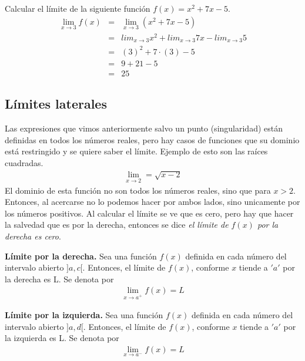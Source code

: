 \begin{myexample}
Calcular el límite de  la siguiente función $f(x)=x^{2}+7x-5$.
\begin{eqnarray*}
\lim_{x\rightarrow 3}f(x)&=&\lim_{x\rightarrow 3}(x^{2}+7x-5)\\
&=&lim_{x\rightarrow 3}x^{2}+lim_{x\rightarrow 3}7x-lim_{x\rightarrow 3}5\\
&=&(3)^{2}+7\cdot (3)-5\\
&=&9+21-5\\
&=&25
\end{eqnarray*}
\end{myexample}

\subsection{Límites laterales}

Las expresiones que vimos anteriormente salvo un punto (singularidad) están definidas en todos los números reales, pero hay casos de funciones que su dominio está restringido y se quiere saber el límite. Ejemplo de esto son las raíces cuadradas.
\begin{eqnarray}
\lim_{x\rightarrow 2}=\sqrt{x-2}
\end{eqnarray}
El dominio de esta función no son todos los números reales, sino que para $x>2$. Entonces, al acercarse no lo podemos hacer por ambos lados, sino unicamente por los números positivos. Al calcular el límite se ve que es cero, pero hay que hacer la salvedad que es por la derecha, entonces se dice \textit{el límite de $f(x)$ por la derecha es cero}.

\begin{mydef}
\textbf{Límite por la derecha. }Sea una función $f(x)$ definida en cada número del intervalo abierto $]a,c[$. Entonces, el límite de $f(x)$, conforme $x$ tiende a $'a'$ por la derecha es L. Se denota por 
\begin{eqnarray*}
\lim_{x\rightarrow a^{+}}f(x)=L
\end{eqnarray*}
\end{mydef}

\begin{mydef}
\textbf{Límite por la izquierda. } Sea una función $f(x)$ definida en cada número del intervalo abierto $]a,d[$. Entonces, el límite de $f(x)$, conforme $x$ tiende a $'a'$ por la izquierda es L. Se denota por 
\begin{eqnarray*}
\lim_{x\rightarrow a^{-}}f(x)=L
\end{eqnarray*}
\end{mydef}

